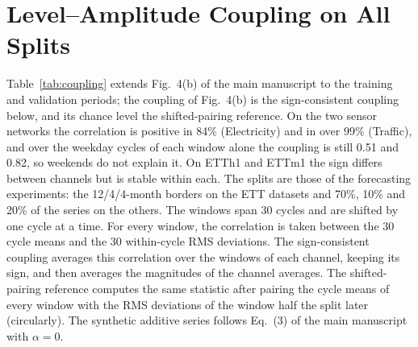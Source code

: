 \documentclass[twocolumn,natbib]{svjour3}
\newcommand{\blue}[1]{#1}
\begin{document}


\blue{
\section{Level--Amplitude Coupling on All Splits}
\label{app:coupling_splits}
Table~\ref{tab:coupling} extends Fig.~4(b) of the main manuscript to the training and validation periods; the coupling of Fig.~4(b) is the sign-consistent coupling below, and its chance level the shifted-pairing reference. On the two sensor networks the correlation is positive in 84\% (Electricity) and in over 99\% (Traffic), and over the weekday cycles of each window alone the coupling is still 0.51 and 0.82, so weekends do not explain it. On ETTh1 and ETTm1 the sign differs between channels but is stable within each. The splits are those of the forecasting experiments: the 12/4/4-month borders on the ETT datasets and 70\%, 10\% and 20\% of the series on the others. The windows span 30 cycles and are shifted by one cycle at a time. For every window, the correlation is taken between the 30 cycle means and the 30 within-cycle RMS deviations. The sign-consistent coupling averages this correlation over the windows of each channel, keeping its sign, and then averages the magnitudes of the channel averages. The shifted-pairing reference computes the same statistic after pairing the cycle means of every window with the RMS deviations of the window half the split later (circularly). The synthetic additive series follows Eq.~(3) of the main manuscript with $\alpha=0$.

}
\end{document}
